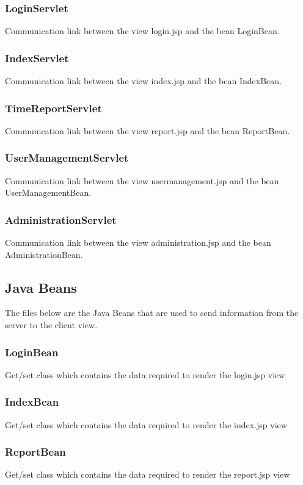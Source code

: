 \documentclass{article}
\begin{document}
\subsubsection{LoginServlet}
Communication link between the view login.jsp and the bean LoginBean.

\subsubsection{IndexServlet}
Communication link between the view index.jsp and the bean IndexBean.

\subsubsection{TimeReportServlet}
Communication link between the view report.jsp and the bean ReportBean.

\subsubsection{UserManagementServlet}
Communication link between the view usermanagement.jsp and the bean UserManagementBean.

\subsubsection{AdministrationServlet}
Communication link between the view administration.jsp and the bean AdministrationBean.

\subsection{Java Beans}
The files below are the Java Beans that are used to send information from the server to the client view.

\subsubsection{LoginBean}
Get/set class which contains the data required to render the login.jsp view

\subsubsection{IndexBean}
Get/set class which contains the data required to render the index.jsp view

\subsubsection{ReportBean}
Get/set class which contains the data required to render the report.jsp view
\end{document}
